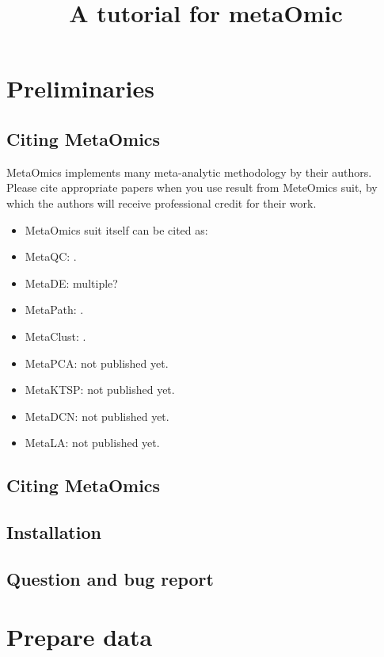 \documentclass{article}
\title{A tutorial for metaOmic}
\author{}
\date{ }
\begin{document}
 
\maketitle
 
\tableofcontents
 
 
 
\section{Preliminaries}
\subsection{Citing MetaOmics}
MetaOmics implements many meta-analytic methodology by their authors. 
Please cite appropriate papers when you use result from MeteOmics suit,
by which the authors will receive professional credit for their work.

\begin{itemize}
\item MetaOmics suit itself can be cited as:
\item MetaQC: .
\item MetaDE: {\color{red}multiple?}
\item MetaPath: .
\item MetaClust: .
\item MetaPCA: not published yet.
\item MetaKTSP: not published yet.
\item MetaDCN: not published yet.
\item MetaLA: not published yet.
\end{itemize}

\subsection{Citing MetaOmics}


\subsection{Installation}
\subsection{Question and bug report}
 
\section{Prepare data}
 
\end{document}

